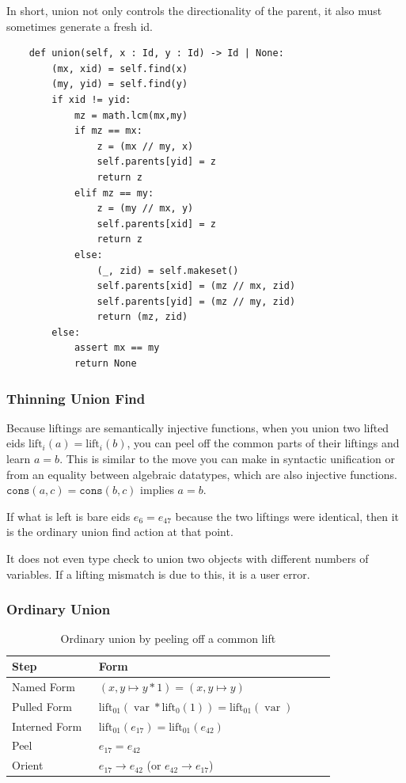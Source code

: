 \documentclass{article}%
\newcommand{\lift}{\text{lift}}
\begin{document}
In short, union not only controls the directionality of the parent, it also must sometimes generate a fresh id.

\begin{lstlisting}
    def union(self, x : Id, y : Id) -> Id | None:
        (mx, xid) = self.find(x)
        (my, yid) = self.find(y)
        if xid != yid:
            mz = math.lcm(mx,my)
            if mz == mx:
                z = (mx // my, x)
                self.parents[yid] = z
                return z
            elif mz == my:
                z = (my // mx, y)
                self.parents[xid] = z
                return z
            else:
                (_, zid) = self.makeset()
                self.parents[xid] = (mz // mx, zid) 
                self.parents[yid] = (mz // my, zid)
                return (mz, zid)
        else:
            assert mx == my
            return None

\end{lstlisting}

\subsubsection{Thinning Union Find}
Because liftings are semantically injective functions, when you union two lifted eids $\lift_i(a) = \lift_i(b)$, you can peel off the common parts of their liftings and learn $a = b$. This is similar to the move you can make in syntactic unification or from an equality between algebraic datatypes, which are also injective functions. $\texttt{cons}(a, c) = \texttt{cons}(b, c)$ implies $a = b$.

If what is left is bare eids $e_6 = e_{47}$ because the two liftings were identical, then it is the ordinary union find action at that point.

It does not even type check to union two objects with different numbers of variables. If a lifting mismatch is due to this, it is a user error.


\subsubsection{Ordinary Union}

\begin{table}[htbp]
\centering
\small
\renewcommand{\arraystretch}{1.4}
\begin{tabular}{p{0.25\linewidth}p{0.68\linewidth}}
\hline
Step & Form \\
\hline
Named Form
&
$(x,y \mapsto y * 1) = (x,y \mapsto y)$
\\
Pulled Form
&
$\lift_{01}(\operatorname{var} * \lift_0(1)) = \lift_{01}(\operatorname{var})$
\\
Interned Form
&
$\lift_{01}(e_{17}) = \lift_{01}(e_{42})$
\\
Peel
&
$e_{17} = e_{42}$
\\
Orient
&
$e_{17} \rightarrow e_{42}$ (or $e_{42} \rightarrow e_{17}$)
\\
\hline
\end{tabular}
\caption{Ordinary union by peeling off a common lift}
\label{tab:ordinary-union}
\end{table}
\end{document}
